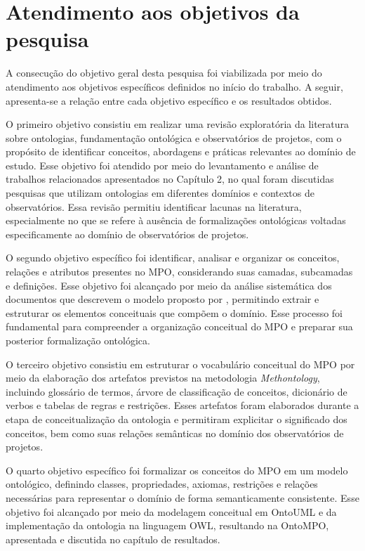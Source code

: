 \section{Atendimento aos objetivos da pesquisa}

A consecução do objetivo geral desta pesquisa foi viabilizada por meio do atendimento aos objetivos específicos definidos no início do trabalho. A seguir, apresenta-se a relação entre cada objetivo específico e os resultados obtidos.

O primeiro objetivo consistiu em realizar uma revisão exploratória da literatura sobre ontologias, fundamentação ontológica e observatórios de projetos, com o propósito de identificar conceitos, abordagens e práticas relevantes ao domínio de estudo. Esse objetivo foi atendido por meio do levantamento e análise de trabalhos relacionados apresentados no Capítulo 2, no qual foram discutidas pesquisas que utilizam ontologias em diferentes domínios e contextos de observatórios. Essa revisão permitiu identificar lacunas na literatura, especialmente no que se refere à ausência de formalizações ontológicas voltadas especificamente ao domínio de observatórios de projetos.

O segundo objetivo específico foi identificar, analisar e organizar os conceitos, relações e atributos presentes no MPO, considerando suas camadas, subcamadas e definições. Esse objetivo foi alcançado por meio da análise sistemática dos documentos que descrevem o modelo proposto por \citeauthor{vieira2022thesis}, permitindo extrair e estruturar os elementos conceituais que compõem o domínio. Esse processo foi fundamental para compreender a organização conceitual do MPO e preparar sua posterior formalização ontológica.

O terceiro objetivo consistiu em estruturar o vocabulário conceitual do MPO por meio da elaboração dos artefatos previstos na metodologia \textit{Methontology}, incluindo glossário de termos, árvore de classificação de conceitos, dicionário de verbos e tabelas de regras e restrições. Esses artefatos foram elaborados durante a etapa de conceitualização da ontologia e permitiram explicitar o significado dos conceitos, bem como suas relações semânticas no domínio dos observatórios de projetos.

O quarto objetivo específico foi formalizar os conceitos do MPO em um modelo ontológico, definindo classes, propriedades, axiomas, restrições e relações necessárias para representar o domínio de forma semanticamente consistente. Esse objetivo foi alcançado por meio da modelagem conceitual em OntoUML e da implementação da ontologia na linguagem OWL, resultando na OntoMPO, apresentada e discutida no capítulo de resultados.

